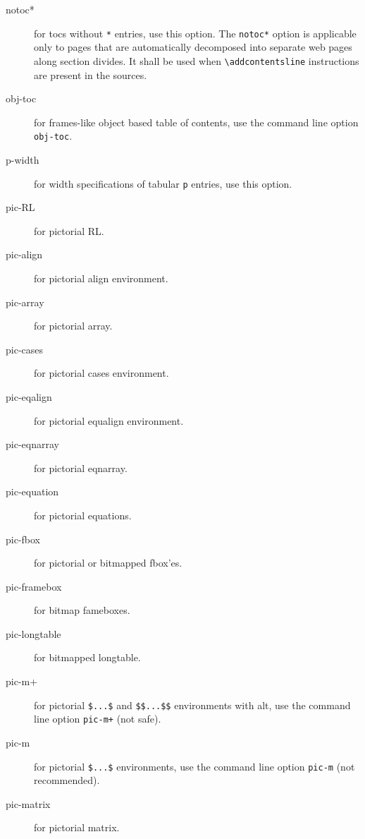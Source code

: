 \begin{description}
\item[notoc*] for tocs without \verb=*= entries, use this option. The
  \verb=notoc*= option is applicable only to pages that are
  automatically decomposed into separate web pages along section
  divides. It shall be used when \verb=\addcontentsline= instructions
  are present in the sources.

\item[obj-toc] for frames-like object based table of contents, use the
  command line option \verb=obj-toc=.


\item[p-width] for width specifications of tabular \verb=p= entries,
  use this option.

\item[pic-RL] for pictorial RL.

\item[pic-align] for pictorial align environment.

\item[pic-array] for pictorial array.

\item[pic-cases] for pictorial cases environment.

\item[pic-eqalign] for pictorial equalign environment.

\item[pic-eqnarray] for pictorial eqnarray.

\item[pic-equation] for pictorial equations.

\item[pic-fbox] for pictorial or bitmapped fbox'es.

\item[pic-framebox] for bitmap fameboxes.

\item[pic-longtable] for bitmapped longtable.

\item[pic-m+] for pictorial \verb=$...$= and \verb=$$...$$=
  environments with \latex alt, use the command line option
  \verb=pic-m+= (not safe).

\item[pic-m] for pictorial \verb=$...$= environments, use the command
  line option \verb=pic-m= (not recommended).

\item[pic-matrix] for pictorial matrix.


\end{description}
